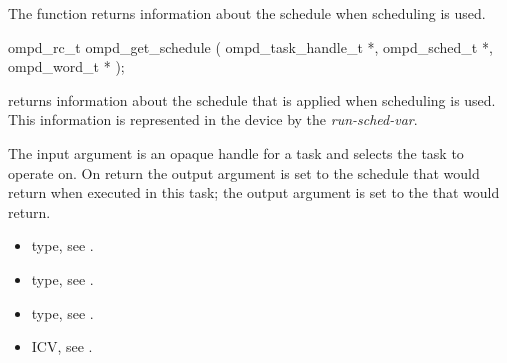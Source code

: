 %	
%	

%
\label{ompd:ompd_get_schedule}
\summary
The  function returns information about the schedule when  scheduling is used.

\format
\cspecificstart
\begin{boxedcode}
ompd\_rc\_t ompd\_get\_schedule (
  ompd\_task\_handle\_t        *, 
  ompd\_sched\_t              *,
  ompd\_word\_t              *
); 
\end{boxedcode}
\cspecificend

\descr

 returns information about the schedule that is
applied when  scheduling is used.
%
This information is represented in the device by the
\emph{run-sched-var}.

\argdesc
The input argument  is an opaque handle for a task and selects the task to operate on.
On return the output argument  is set to the schedule that  would return when
executed in this task; the output argument  is set to the  that 
 would return.


\crossreferences
\begin{itemize}
	\item {} type, see .
	\item {} type, see .
	\item {} type, see .
	\item {} ICV, see .
\end{itemize}


